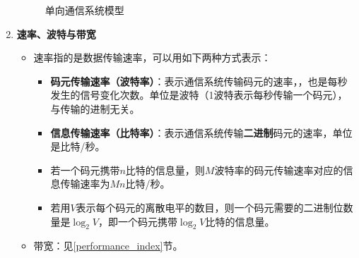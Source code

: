 \documentclass[12pt, a4paper, oneside]{ctexart}
\begin{document}
\begin{enumerate}
\begin{figure}[h]
        \caption{单向通信系统模型}
    \end{figure}
    \item {\bf 速率、波特与带宽}
    \begin{itemize}
        \item 速率指的是数据传输速率，可以用如下两种方式表示：
        \begin{itemize}
            \item {\bf 码元传输速率（波特率）}：表示通信系统传输码元的速率，，也是每秒发生的信号变化次数。单位是波特（1波特表示每秒传输一个码元），与传输的进制无关。
            \item {\bf 信息传输速率（比特率）}：表示通信系统传输\textbf{二进制}码元的速率，单位是比特/秒。
            \item 若一个码元携带$n$比特的信息量，则$M$波特率的码元传输速率对应的信息传输速率为$Mn$比特/秒。
            \item 若用$V$表示每个码元的离散电平的数目，则一个码元需要的二进制位数量是$\log_2 V$，即一个码元携带$\log_2 V$比特的信息量。
        \end{itemize}
        \item 带宽：见\ref{performance_index}节。
    \end{itemize}
\end{enumerate}
\end{document}
